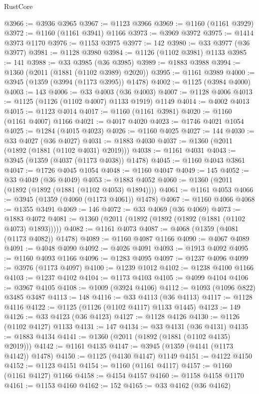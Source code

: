\begin{lexlean}{RustCore}
\begin{coremodule}
@3966 := @3936 @3965
@3967 := @1123 @3966
@3969 := @1160 (@1161 @3929)
@3972 := @1160 (@1161 @3941) @1166
@3973 := @3969 @3972
@3975 := @1414 @3973 @1170
@3976 := @1153 @3975
@3977 := 142
@3980 := @33 @3977 (@36 @3977)
@3981 := @1128 @3980
@3984 := @1126 (@1102 @3981) @1133
@3985 := 141
@3988 := @33 @3985 (@36 @3985)
@3989 := @1883 @3988
@3994 := @1360 (@2011 (@1881 (@1102 @3989) @2020))
@3995 := @1161 @3989
@4000 := @3945 (@1359 (@3994 (@1173 @3995)) @1478)
@4002 := @1125 (@3984 @4000)
@4003 := 143
@4006 := @33 @4003 (@36 @4003)
@4007 := @1128 @4006
@4013 := @1125 (@1126 (@1102 @4007) @1133 @1919) @1149
@4014 := @4002 @4013
@4015 := @1123 @4014
@4017 := @1160 (@1161 @3981)
@4020 := @1160 (@1161 @4007) @1166
@4021 := @4017 @4020
@4023 := @1746 @4021 @1054
@4025 := @1284 (@4015 @4023)
@4026 := @1160 @4025
@4027 := 144
@4030 := @33 @4027 (@36 @4027)
@4031 := @1883 @4030
@4037 := @1360 (@2011 (@1892 (@1881 (@1102 @4031) @2019)))
@4038 := @1161 @4031
@4043 := @3945 (@1359 (@4037 (@1173 @4038)) @1478)
@4045 := @1160 @4043 @3861
@4047 := @1726 @4045 @1054
@4048 := @1160 @4047
@4049 := 145
@4052 := @33 @4049 (@36 @4049)
@4053 := @1883 @4052
@4060 := @1360 (@2011 (@1892 (@1892 (@1881 (@1102 @4053) @1894))))
@4061 := @1161 @4053
@4066 := @3945 (@1359 (@4060 (@1173 @4061)) @1478)
@4067 := @1160 @4066
@4068 := @1355 @3491
@4069 := 146
@4072 := @33 @4069 (@36 @4069)
@4073 := @1883 @4072
@4081 := @1360 (@2011 (@1892 (@1892 (@1892 (@1881 (@1102 @4073) @1893)))))
@4082 := @1161 @4073
@4087 := @4068 (@1359 (@4081 (@1173 @4082)) @1478)
@4089 := @1160 @4087 @1166
@4090 := @4067 @4089
@4091 := @4048 @4090
@4092 := @4026 @4091
@4093 := @1913 @4092
@4095 := @1160 @4093 @1166
@4096 := @1283 @4095
@4097 := @1237 @4096
@4099 := @3976 (@1173 @4097)
@4100 := @1239 @1012
@4102 := @1238 @4100 @1166
@4103 := @1237 @4102
@4104 := @1173 @4103
@4105 := @4099 @4104
@4106 := @3967 @4105
@4108 := @1009 (@3924 @4106)
@4112 := @1093 (@1096 @822) @3485 @3487
@4113 := 148
@4116 := @33 @4113 (@36 @4113)
@4117 := @1128 @4116
@4122 := @1125 (@1126 (@1102 @4117) @1133 @1445)
@4123 := 149
@4126 := @33 @4123 (@36 @4123)
@4127 := @1128 @4126
@4130 := @1126 (@1102 @4127) @1133
@4131 := 147
@4134 := @33 @4131 (@36 @4131)
@4135 := @1883 @4134
@4141 := @1360 (@2011 (@1892 (@1881 (@1102 @4135) @2019)))
@4142 := @1161 @4135
@4147 := @3945 (@1359 (@4141 (@1173 @4142)) @1478)
@4150 := @1125 (@4130 @4147) @1149
@4151 := @4122 @4150
@4152 := @1123 @4151
@4154 := @1160 (@1161 @4117)
@4157 := @1160 (@1161 @4127) @1166
@4158 := @4154 @4157
@4160 := @1158 @4158 @1170
@4161 := @1153 @4160
@4162 := 152
@4165 := @33 @4162 (@36 @4162)

\end{coremodule}
\end{lexlean}
